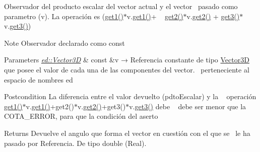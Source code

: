 Observador del producto escalar del vector actual y el vector~\newline
 pasado como parametro (v). La operación es (\mbox{\hyperlink{classed_1_1Vector3D_ac96497e7c082fde19b4998408e4ec36b}{get1()}}$\ast$v.\mbox{\hyperlink{classed_1_1Vector3D_ac96497e7c082fde19b4998408e4ec36b}{get1()}}+ ~\newline
 \mbox{\hyperlink{classed_1_1Vector3D_acb66f2ac0cb4f24592698fb317458e35}{get2()}}$\ast$v.\mbox{\hyperlink{classed_1_1Vector3D_acb66f2ac0cb4f24592698fb317458e35}{get2()}} + \mbox{\hyperlink{classed_1_1Vector3D_a50c08e3089bc1b0cd5de77d8f0086cc0}{get3()}}$\ast$v.\mbox{\hyperlink{classed_1_1Vector3D_a50c08e3089bc1b0cd5de77d8f0086cc0}{get3()}}) 

\begin{DoxyNote}{Note}
Observador declarado como const
\end{DoxyNote}

\begin{DoxyParams}{Parameters}
{\em \mbox{\hyperlink{classed_1_1Vector3D}{ed\+::\+Vector3D}}} & const \&v → Referencia constante de tipo \mbox{\hyperlink{classed_1_1Vector3D}{Vector3D}}~\newline
 que posee el valor de cada una de las componentes del vector.~\newline
 perteneciente al espacio de nombres ed\\
\hline
\end{DoxyParams}
\begin{DoxyPostcond}{Postcondition}
La diferencia entre el valor devuelto (pdto\+Escalar) y la ~\newline
 operación \mbox{\hyperlink{classed_1_1Vector3D_ac96497e7c082fde19b4998408e4ec36b}{get1()}}$\ast$v.\mbox{\hyperlink{classed_1_1Vector3D_ac96497e7c082fde19b4998408e4ec36b}{get1()}}+get2()$\ast$v.\mbox{\hyperlink{classed_1_1Vector3D_acb66f2ac0cb4f24592698fb317458e35}{get2()}}+get3()$\ast$v.\mbox{\hyperlink{classed_1_1Vector3D_a50c08e3089bc1b0cd5de77d8f0086cc0}{get3()}} debe ~\newline
 debe ser menor que la C\+O\+T\+A\+\_\+\+E\+R\+R\+OR, para que la condición del aserto~\newline
 
\end{DoxyPostcond}
\begin{DoxyReturn}{Returns}
Devuelve el angulo que forma el vector en cuestión con el que se~\newline
 le ha pasado por Referencia. De tipo double (Real). 
\end{DoxyReturn}
\mbox{\label{classed_1_1Vector3D_a8aa810ccaca06f0f0a34871433e7235b}} 
